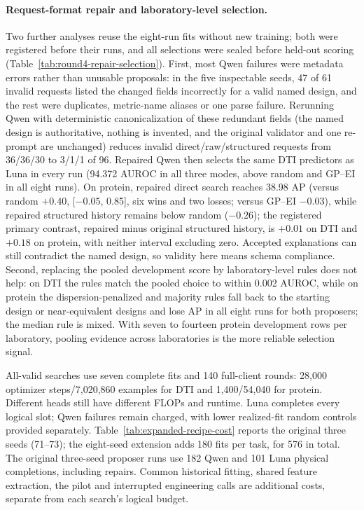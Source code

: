 \paragraph{Request-format repair and laboratory-level selection.} Two further analyses reuse the eight-run fits without new training; both were registered before their runs, and all selections were sealed before held-out scoring (Table~\ref{tab:round4-repair-selection}). First, most Qwen failures were metadata errors rather than unusable proposals: in the five inspectable seeds, 47 of 61 invalid requests listed the changed fields incorrectly for a valid named design, and the rest were duplicates, metric-name aliases or one parse failure. Rerunning Qwen with deterministic canonicalization of these redundant fields (the named design is authoritative, nothing is invented, and the original validator and one re-prompt are unchanged) reduces invalid direct/raw/structured requests from 36/36/30 to 3/1/1 of 96. Repaired Qwen then selects the same DTI predictors as Luna in every run (94.372 AUROC in all three modes, above random and GP--EI in all eight runs). On protein, repaired direct search reaches 38.98 AP (versus random $+0.40$, [$-0.05$, 0.85], six wins and two losses; versus GP--EI $-0.03$), while repaired structured history remains below random ($-0.26$); the registered primary contrast, repaired minus original structured history, is $+0.01$ on DTI and $+0.18$ on protein, with neither interval excluding zero. Accepted explanations can still contradict the named design, so validity here means schema compliance. Second, replacing the pooled development score by laboratory-level rules does not help: on DTI the rules match the pooled choice to within 0.002 AUROC, while on protein the dispersion-penalized and majority rules fall back to the starting design or near-equivalent designs and lose AP in all eight runs for both proposers; the median rule is mixed. With seven to fourteen protein development rows per laboratory, pooling evidence across laboratories is the more reliable selection signal.





All-valid searches use seven complete fits and 140 full-client rounds: 28,000 optimizer steps/7,020,860 examples for DTI and 1,400/54,040 for protein. Different heads still have different FLOPs and runtime. Luna completes every logical slot; Qwen failures remain charged, with lower realized-fit random controls provided separately. Table~\ref{tab:expanded-recipe-cost} reports the original three seeds (71--73); the eight-seed extension adds 180 fits per task, for 576 in total. The original three-seed proposer runs use 182 Qwen and 101 Luna physical completions, including repairs. Common historical fitting, shared feature extraction, the pilot and interrupted engineering calls are additional costs, separate from each search's logical budget.
